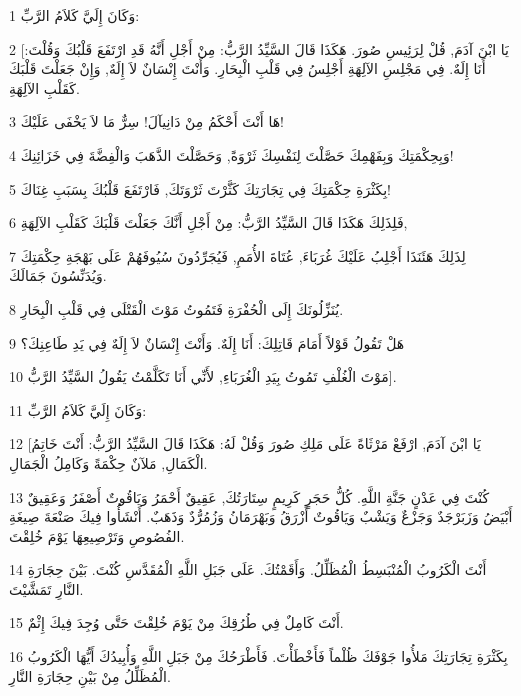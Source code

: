 \par 1 وَكَانَ إِلَيَّ كَلاَمُ الرَّبِّ:
\par 2 [يَا ابْنَ آدَمَ, قُلْ لِرَئِيسِ صُورَ. هَكَذَا قَالَ السَّيِّدُ الرَّبُّ: مِنْ أَجْلِ أَنَّهُ قَدِ ارْتَفَعَ قَلْبُكَ وَقُلْتَ: أَنَا إِلَهٌ. فِي مَجْلِسِ الآلِهَةِ أَجْلِسُ فِي قَلْبِ الْبِحَارِ. وَأَنْتَ إِنْسَانٌ لاَ إِلَهٌ, وَإِنْ جَعَلْتَ قَلْبَكَ كَقَلْبِ الآلِهَةِ.
\par 3 هَا أَنْتَ أَحْكَمُ مِنْ دَانِيآلَ! سِرٌّ مَا لاَ يَخْفَى عَلَيْكَ!
\par 4 وَبِحِكْمَتِكَ وَبِفَهْمِكَ حَصَّلْتَ لِنَفْسِكَ ثَرْوَةً, وَحَصَّلْتَ الذَّهَبَ وَالْفِضَّةَ فِي خَزَائِنِكَ!
\par 5 بِكَثْرَةِ حِكْمَتِكَ فِي تِجَارَتِكَ كَثَّرْتَ ثَرْوَتَكَ, فَارْتَفَعَ قَلْبُكَ بِسَبَبِ غِنَاكَ!
\par 6 فَلِذَلِكَ هَكَذَا قَالَ السَّيِّدُ الرَّبُّ: مِنْ أَجْلِ أَنَّكَ جَعَلْتَ قَلْبَكَ كَقَلْبِ الآلِهَةِ,
\par 7 لِذَلِكَ هَئَنَذَا أَجْلِبُ عَلَيْكَ غُرَبَاءَ, عُتَاةَ الأُمَمِ, فَيُجَرِّدُونَ سُيُوفَهُمْ عَلَى بَهْجَةِ حِكْمَتِكَ وَيُدَنِّسُونَ جَمَالَكَ.
\par 8 يُنَزِّلُونَكَ إِلَى الْحُفْرَةِ فَتَمُوتُ مَوْتَ الْقَتْلَى فِي قَلْبِ الْبِحَارِ.
\par 9 هَلْ تَقُولُ قَوْلاً أَمَامَ قَاتِلِكَ: أَنَا إِلَهٌ. وَأَنْتَ إِنْسَانٌ لاَ إِلَهٌ فِي يَدِ طَاعِنِكَ؟
\par 10 مَوْتَ الْغُلْفِ تَمُوتُ بِيَدِ الْغُرَبَاءِ, لأَنِّي أَنَا تَكَلَّمْتُ يَقُولُ السَّيِّدُ الرَّبُّ].
\par 11 وَكَانَ إِلَيَّ كَلاَمُ الرَّبِّ:
\par 12 [يَا ابْنَ آدَمَ, ارْفَعْ مَرْثَاةً عَلَى مَلِكِ صُورَ وَقُلْ لَهُ: هَكَذَا قَالَ السَّيِّدُ الرَّبُّ: أَنْتَ خَاتِمُ الْكَمَالِ, مَلآنٌ حِكْمَةً وَكَامِلُ الْجَمَالِ.
\par 13 كُنْتَ فِي عَدْنٍ جَنَّةِ اللَّهِ. كُلُّ حَجَرٍ كَرِيمٍ سِتَارَتُكَ, عَقِيقٌ أَحْمَرُ وَيَاقُوتٌ أَصْفَرُ وَعَقِيقٌ أَبْيَضُ وَزَبَرْجَدٌ وَجَزْعٌ وَيَشْبٌ وَيَاقُوتٌ أَزْرَقُ وَبَهْرَمَانُ وَزُمُرُّدٌ وَذَهَبٌ. أَنْشَأُوا فِيكَ صَنْعَةَ صِيغَةِ الفُصُوصِ وَتَرْصِيعِهَا يَوْمَ خُلِقْتَ.
\par 14 أَنْتَ الْكَرُوبُ الْمُنْبَسِطُ الْمُظَلِّلُ. وَأَقَمْتُكَ. عَلَى جَبَلِ اللَّهِ الْمُقَدَّسِ كُنْتَ. بَيْنَ حِجَارَةِ النَّارِ تَمَشَّيْتَ.
\par 15 أَنْتَ كَامِلٌ فِي طُرُقِكَ مِنْ يَوْمَ خُلِقْتَ حَتَّى وُجِدَ فِيكَ إِثْمٌ.
\par 16 بِكَثْرَةِ تِجَارَتِكَ مَلأُوا جَوْفَكَ ظُلْماً فَأَخْطَأْتَ. فَأَطْرَحُكَ مِنْ جَبَلِ اللَّهِ وَأُبِيدُكَ أَيُّهَا الْكَرُوبُ الْمُظَلِّلُ مِنْ بَيْنِ حِجَارَةِ النَّارِ.
